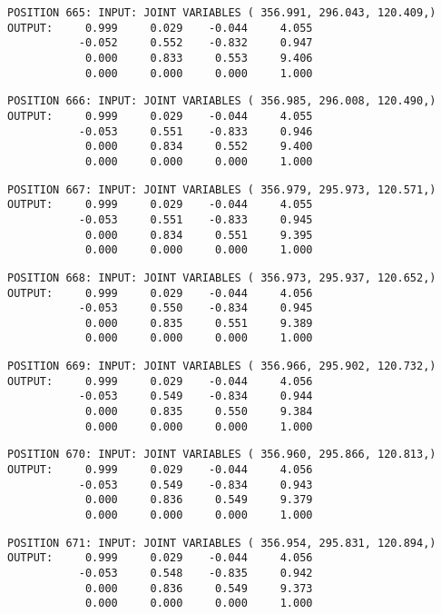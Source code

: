 \begin{verbatim}
POSITION 665: INPUT: JOINT VARIABLES ( 356.991, 296.043, 120.409,)
OUTPUT:     0.999     0.029    -0.044     4.055
           -0.052     0.552    -0.832     0.947
            0.000     0.833     0.553     9.406
            0.000     0.000     0.000     1.000
\end{verbatim} \pagebreak[1]\begin{verbatim}
POSITION 666: INPUT: JOINT VARIABLES ( 356.985, 296.008, 120.490,)
OUTPUT:     0.999     0.029    -0.044     4.055
           -0.053     0.551    -0.833     0.946
            0.000     0.834     0.552     9.400
            0.000     0.000     0.000     1.000
\end{verbatim} \pagebreak[1]\begin{verbatim}
POSITION 667: INPUT: JOINT VARIABLES ( 356.979, 295.973, 120.571,)
OUTPUT:     0.999     0.029    -0.044     4.055
           -0.053     0.551    -0.833     0.945
            0.000     0.834     0.551     9.395
            0.000     0.000     0.000     1.000
\end{verbatim} \pagebreak[1]\begin{verbatim}
POSITION 668: INPUT: JOINT VARIABLES ( 356.973, 295.937, 120.652,)
OUTPUT:     0.999     0.029    -0.044     4.056
           -0.053     0.550    -0.834     0.945
            0.000     0.835     0.551     9.389
            0.000     0.000     0.000     1.000
\end{verbatim} \pagebreak[1]\begin{verbatim}
POSITION 669: INPUT: JOINT VARIABLES ( 356.966, 295.902, 120.732,)
OUTPUT:     0.999     0.029    -0.044     4.056
           -0.053     0.549    -0.834     0.944
            0.000     0.835     0.550     9.384
            0.000     0.000     0.000     1.000
\end{verbatim} \pagebreak[1]\begin{verbatim}
POSITION 670: INPUT: JOINT VARIABLES ( 356.960, 295.866, 120.813,)
OUTPUT:     0.999     0.029    -0.044     4.056
           -0.053     0.549    -0.834     0.943
            0.000     0.836     0.549     9.379
            0.000     0.000     0.000     1.000
\end{verbatim} \pagebreak[1]\begin{verbatim}
POSITION 671: INPUT: JOINT VARIABLES ( 356.954, 295.831, 120.894,)
OUTPUT:     0.999     0.029    -0.044     4.056
           -0.053     0.548    -0.835     0.942
            0.000     0.836     0.549     9.373
            0.000     0.000     0.000     1.000
\end{verbatim} \pagebreak[1]\begin{verbatim}

\end{verbatim}
